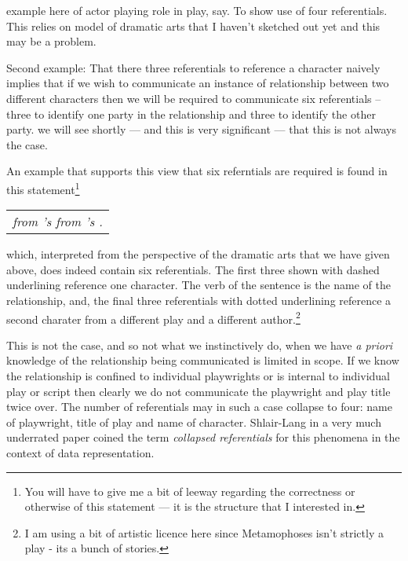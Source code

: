\mynote example here of actor playing role in play, say. To show use of four referentials.
This relies on model of dramatic arts that I haven't sketched out yet and this may be a problem.

\mynote Second example:
That there three referentials to reference a character naively implies that if we wish to communicate an instance of relationship between two different characters then we will be required to communicate six referentials
 -- three to identify one party in the relationship and three to identify the other party. 
 we will see shortly  --- and this is very significant --- that this is not always the case.

An example that supports this view that six referntials are required is found in this statement\footnote{You will have to give me a bit of leeway regarding the correctness or otherwise of this statement --- it is the structure that I interested in.}
\begin{center}
\begin{tabular}{l}
\parbox{7cm}{\textit{ from 's 
                             from 's .}}
\end{tabular}
\end{center}
which, interpreted from the perspective of the dramatic arts that we have given above, does indeed contain six referentials. The first three shown with dashed underlining reference one character.
The verb of the sentence is the name of the relationship, and, the final three referentials with dotted underlining reference a second charater from a different play and a different author.\footnote{I am using a bit of artistic licence here since Metamophoses isn't strictly a play - its a bunch of stories.}

\mynote
 This is not the case, and so not what we instinctively do, when we have \textit{a priori} knowledge of the relationship being communicated is limited in scope. If we know the relationship is confined to individual playwrights or is internal to individual play or script then clearly we do not 
  communicate the playwright and play title twice over. The number of referentials may in such a case collapse to four: name of playwright, title of play and name of character.
Shlair-Lang in a very much underrated paper coined the term \textit{collapsed referentials} for this phenomena in the context of data representation.

